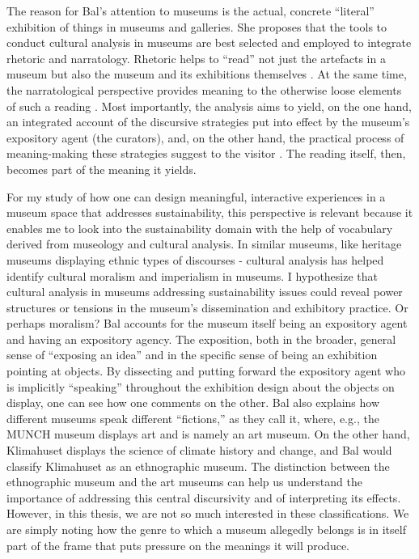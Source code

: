 The reason for Bal’s attention to museums is the actual, concrete “literal” exhibition of things in museums and galleries. She proposes that the tools to conduct cultural analysis in museums are best selected and employed to integrate rhetoric and narratology. Rhetoric helps to “read” not just the artefacts in a museum but also the museum and its exhibitions themselves \autocite[p. 7]{Miekebal_book}. At the same time, the narratological perspective provides meaning to the otherwise loose elements of such a reading \autocite[p. 7]{Miekebal_book}. Most importantly, the analysis aims to yield, on the one hand, an integrated account of the discursive strategies put into effect by the museum's expository agent (the curators), and, on the other hand, the practical process of meaning-making these strategies suggest to the visitor \autocite[p. 7]{Miekebal_book}. The reading itself, then, becomes part of the meaning it yields.

For my study of how one can design meaningful, interactive experiences in a museum space that addresses sustainability, this perspective is relevant because it enables me to look into the sustainability domain with the help of vocabulary derived from museology and cultural analysis. In similar museums, like heritage museums displaying ethnic types of discourses - cultural analysis has helped identify cultural moralism and imperialism in museums. I hypothesize that cultural analysis in museums addressing sustainability issues could reveal power structures or tensions in the museum's dissemination and exhibitory practice. Or perhaps moralism? Bal accounts for the museum itself being an expository agent and having an expository agency. The exposition, both in the broader, general sense of “exposing an idea” and in the specific sense of being an exhibition pointing at objects. By dissecting and putting forward the expository agent who is implicitly “speaking” throughout the exhibition design about the objects on display, one can see how one comments on the other. Bal also explains how different museums speak different “fictions,” as they call it, where, e.g., the MUNCH museum displays art and is namely an art museum. On the other hand, Klimahuset displays the science of climate history and change, and Bal would classify Klimahuset as an ethnographic museum. The distinction between the ethnographic museum and the art museums can help us understand the importance of addressing this central discursivity and of interpreting its effects. However, in this thesis, we are not so much interested in these classifications. We are simply noting how the genre to which a museum allegedly belongs is in itself part of the frame that puts pressure on the meanings it will produce.


